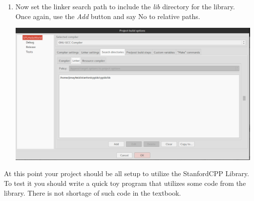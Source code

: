 \documentclass[10pt]{article}
\begin{document}
\begin{enumerate}
\item Now set the linker search path to include the \textit{lib} directory for the library. Once again, use the \textit{Add} button and say No to relative paths.

\vspace{.1in}
\begin{center}
\includegraphics[scale=.35]{scpplib-linkersearch.png}
\end{center}
\vspace{.1in}

\end{enumerate}

At this point your project should be all setup to utilize the StanfordCPP Library. To test it you should write a quick toy program that utilizes some code from the library. There is not shortage of such code in the textbook.
\end{document}
